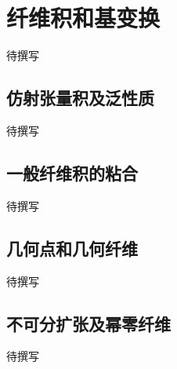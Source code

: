 
% 
% 

\section{纤维积和基变换}
\label{g5:sec:1101}

待撰写

\subsection{仿射张量积及泛性质}
\label{g5:subsec:1101:01}
待撰写

\subsection{一般纤维积的粘合}
\label{g5:subsec:1101:02}
待撰写

\subsection{几何点和几何纤维}
\label{g5:subsec:1101:03}
待撰写

\subsection{不可分扩张及幂零纤维}
\label{g5:subsec:1101:04}
待撰写
